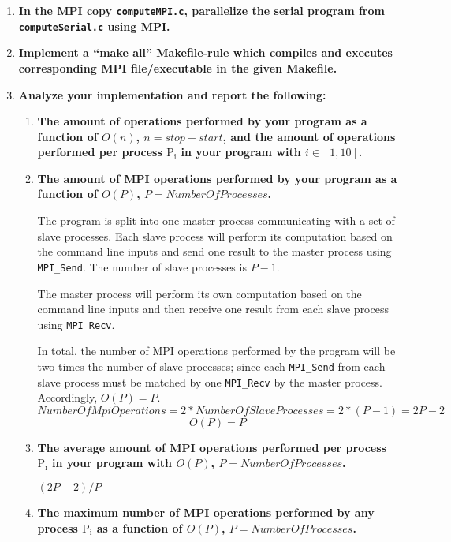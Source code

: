 \begin{enumerate}

\item \textbf{In the MPI copy \texttt{computeMPI.c}, parallelize the serial program from \texttt{computeSerial.c} using MPI.}

\item \textbf{Implement a ``make all'' Makefile-rule which compiles and executes corresponding MPI file/executable in the given Makefile.}

\item \textbf{Analyze your implementation and report the following:}

\begin{enumerate}

\item \textbf{The amount of operations performed by your program as a function of $O(n)$, $n = stop - start$, and the amount of operations performed per process $\text{P}_\text{i}$ in your program with $i \in [1, 10]$.}

\item \textbf{The amount of MPI operations performed by your program as a function of $O(P)$, $P = NumberOfProcesses$.}

The program is split into one master process communicating with a set of slave processes. Each slave process will perform its computation based on the command line inputs and send one result to the master process using \texttt{MPI\_Send}. The number of slave processes is $P - 1$.

The master process will perform its own computation based on the command line inputs and then receive one result from each slave process using \texttt{MPI\_Recv}.

In total, the number of MPI operations performed by the program will be two times the number of slave processes; since each \texttt{MPI\_Send} from each slave process must be matched by one \texttt{MPI\_Recv} by the master process. Accordingly, $O(P) = P$.
$$\textit{NumberOfMpiOperations} = 2 * \textit{NumberOfSlaveProcesses} = 2 * (P - 1) = 2P - 2$$
$$O(P) = P$$

\item \textbf{The average amount of MPI operations performed per process $\text{P}_\text{i}$ in your program with $O(P)$, $P = NumberOfProcesses$.}

$(2P - 2) / P$

\item \textbf{The maximum number of MPI operations performed by any process $\text{P}_\text{i}$ as a function of $O(P)$, $P = NumberOfProcesses$.}


\end{enumerate}
\end{enumerate}
